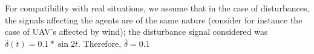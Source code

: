 For compatibility with real situations, we assume that in the case
of disturbances, the signals affecting the agents are of the same nature
(consider for instance the case of UAV's affected by wind); the disturbance
signal considered was $\delta(t) = 0.1 * \sin 2t$. Therefore,
$\overline{\delta} = 0.1$
